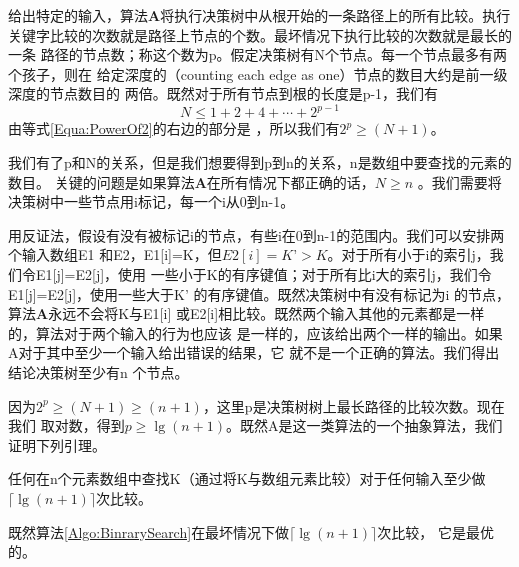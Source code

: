 给出特定的输入，算法\textbf{A}将执行决策树中从根开始的一条路径上的所有比较。执行
关键字比较的次数就是路径上节点的个数。最坏情况下执行比较的次数就是最长的一条
路径的节点数；称这个数为p。假定决策树有N个节点。每一个节点最多有两个孩子，则在
给定深度的（counting each edge as one）节点的数目大约是前一级深度的节点数目的
两倍。既然对于所有节点到根的长度是p-1，我们有
\begin{displaymath}
N\leq 1+2+4+\cdots+2^{p-1}
\end{displaymath}
由等式\ref{Equa:PowerOf2}的右边的部分是 ，所以我们有$2^p \geq (N+1)$。

我们有了p和N的关系，但是我们想要得到p到n的关系，n是数组中要查找的元素的数目。
关键的问题是如果算法\textbf{A}在所有情况下都正确的话，$N \geq n$ 。我们需要将
决策树中一些节点用i标记，每一个i从0到n-1。

用反证法，假设有没有被标记i的节点，有些i在0到n-1的范围内。我们可以安排两个输入数组E1
和E2，E1[i]=K，但$E2[i]=K’>K$。对于所有小于i的索引j，我们令E1[j]=E2[j]，使用
一些小于K的有序键值；对于所有比i大的索引j，我们令E1[j]=E2[j]，使用一些大于K’
的有序键值。既然决策树中有没有标记为i 的节点，算法\textbf{A}永远不会将K与E1[i]
或E2[i]相比较。既然两个输入其他的元素都是一样的，算法对于两个输入的行为也应该
是一样的，应该给出两个一样的输出。如果A对于其中至少一个输入给出错误的结果，它
就不是一个正确的算法。我们得出结论决策树至少有n 个节点。

因为$2^p \geq (N+1) \geq (n+1)$，这里p是决策树树上最长路径的比较次数。现在我们
取对数，得到$p \geq \lg(n+1)$。既然A是这一类算法的一个抽象算法，我们证明下列引理。

\begin{theorem}
任何在n个元素数组中查找K（通过将K与数组元素比较）对于任何输入至少做
$\lceil\lg(n+1)\rceil$次比较。
\end{theorem}

\begin{corollary}
既然算法\ref{Algo:BinrarySearch}在最坏情况下做$\lceil\lg(n+1)\rceil$次比较，
它是最优的。
\end{corollary}
